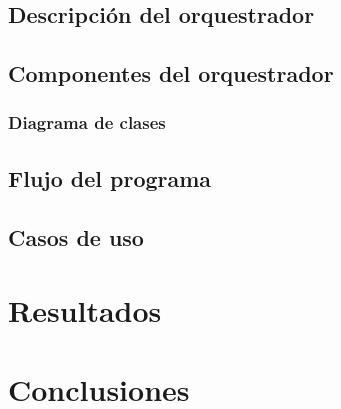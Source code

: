 \documentclass[letterpaper,12pt,oneside]{book}
\begin{document}
\section{Descripción del orquestrador}


\section{Componentes del orquestrador}

\subsection{Diagrama de clases}


\section{Flujo del programa}



\section{Casos de uso}



\chapter{Resultados}  %



\chapter{Conclusiones}  %


\end{document}
